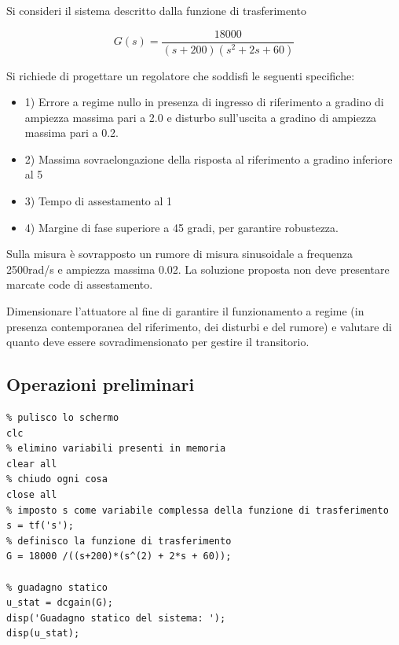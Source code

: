 \documentclass{article}
\begin{document}
\begin{par}
Si consideri il sistema descritto dalla funzione di trasferimento
\end{par} \vspace{1em}
\begin{par}
$$ G(s) = \frac{18000}{(s+200)(s^2 + 2s + 60)} $$
\end{par} \vspace{1em}
\begin{par}
Si richiede di progettare un regolatore che soddisfi le seguenti specifiche:
\begin{itemize}
\setlength{\itemsep}{-1ex}
   \item 1) Errore a regime nullo in presenza di ingresso di riferimento a gradino di ampiezza massima pari a 2.0 e disturbo sull'uscita a gradino di ampiezza massima pari a 0.2.
   \item 2) Massima sovraelongazione della risposta al riferimento a gradino inferiore al 5%
   \item 3) Tempo di assestamento al 1%
   \item 4) Margine di fase superiore a 45 gradi, per garantire robustezza.
\end{itemize}

Sulla misura è sovrapposto un rumore di misura sinusoidale a frequenza 2500rad/s e ampiezza massima 0.02.
La soluzione proposta non deve presentare marcate code di assestamento.

Dimensionare l'attuatore al fine di garantire il funzionamento a regime (in presenza contemporanea
del riferimento, dei disturbi e del rumore) e valutare di quanto deve essere sovradimensionato per
gestire il transitorio.
\end{par}

\clearpage

\subsection*{Operazioni preliminari}

\begin{verbatim}
% pulisco lo schermo
clc
% elimino variabili presenti in memoria
clear all
% chiudo ogni cosa
close all
% imposto s come variabile complessa della funzione di trasferimento
s = tf('s');
% definisco la funzione di trasferimento
G = 18000 /((s+200)*(s^(2) + 2*s + 60));

% guadagno statico
u_stat = dcgain(G);
disp('Guadagno statico del sistema: ');
disp(u_stat);
\end{verbatim}
\end{document}
